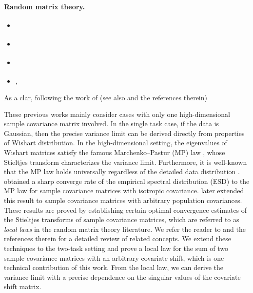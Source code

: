\paragraph{Random matrix theory.}
\begin{itemize}
	\item \citet{hastie2019surprises}
	\item \citet{bartlett2020benign}
	\item \citet{liang2020just}
	\item \citet{montanari2019generalization}, \citet{liang2020precise}
\end{itemize}
\begin{remark}
    As a clar,  following the work of \citet{hastie2019surprises} (see also \citet{bartlett2020benign} and the references therein)
\end{remark}

These previous works mainly consider cases with only one high-dimensional sample covariance matrix involved. %
In the single task case, if the data is Gaussian, then the precise variance limit can be derived directly from properties of Wishart distribution. In the high-dimensional setting, the eigenvalues of Wishart matrices satisfy the famous Marchenko–Pastur (MP) law \cite{MP}, whose Stieltjes transform characterizes the variance limit. Furthermore, it is well-known that the MP law holds universally regardless of the detailed data distribution \cite{bai2010spectral}. \cite{isotropic} obtained a sharp converge rate of the empirical spectral distribution (ESD) to the MP law for sample covariance matrices with isotropic covariance. \cite{Anisotropic,DY} later extended this result to sample covariance matrices with arbitrary population covariances. These results are proved by establishing certain optimal convergence estimates of the Stieltjes transforms of sample covariance matrices, which are referred to as \emph{local laws} in the random matrix theory literature. We refer the reader to \cite{erdos2017dynamical} and the references therein for a detailed review of related concepts. We extend these techniques to the two-task setting and prove a local law for the sum of two sample covariance matrices with an arbitrary covariate shift, which is one technical contribution of this work. From the local law, we can derive the variance limit with a precise dependence on the singular values of the covariate shift matrix. 

